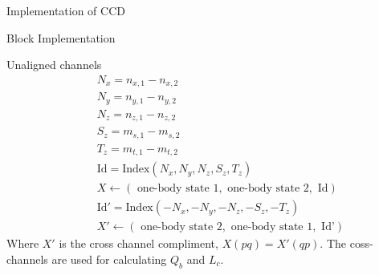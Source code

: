 \documentclass[twoside,english]{uiofysmaster}
\begin{document}
\begin{chapter}{Implementation of CCD}
\begin{section}{Block Implementation}
\begin{subsection}{Unaligned channels}
\begin{align*}
				&\:\:\:\:\:\: N_x = n_{x,1} - n_{x,2} \\
				&\:\:\:\:\:\: N_y = n_{y,1} - n_{y,2} \\
				&\:\:\:\:\:\: N_z = n_{z,1} - n_{z,2} \\
 				&\:\:\:\:\:\: S_z = m_{s,1} - m_{s,2} \\
				&\:\:\:\:\:\: T_z = m_{t,1} - m_{t,2} \\
				&\:\:\:\:\:\: \text{Id} = \text{Index}(N_x,N_y,N_z,S_z,T_z) \\
				&\:\:\:\:\:\: X \leftarrow (\text{ one-body state 1}, \text{ one-body state 2}, \text{ Id}) \\
				&\:\:\:\:\:\: \text{Id}' = \text{Index}(-N_x,-N_y,-N_z,-S_z,-T_z) \\
				&\:\:\:\:\:\: X' \leftarrow (\text{ one-body state 2}, \text{ one-body state 1}, \text{ Id'})
			\end{align*}
			Where $X'$ is the cross channel compliment, $X(pq) = X'(qp)$. The coss-channels are used for calculating $Q_b$ and $L_c$. 


\end{subsection}
\end{section}
\end{chapter}
\end{document}
